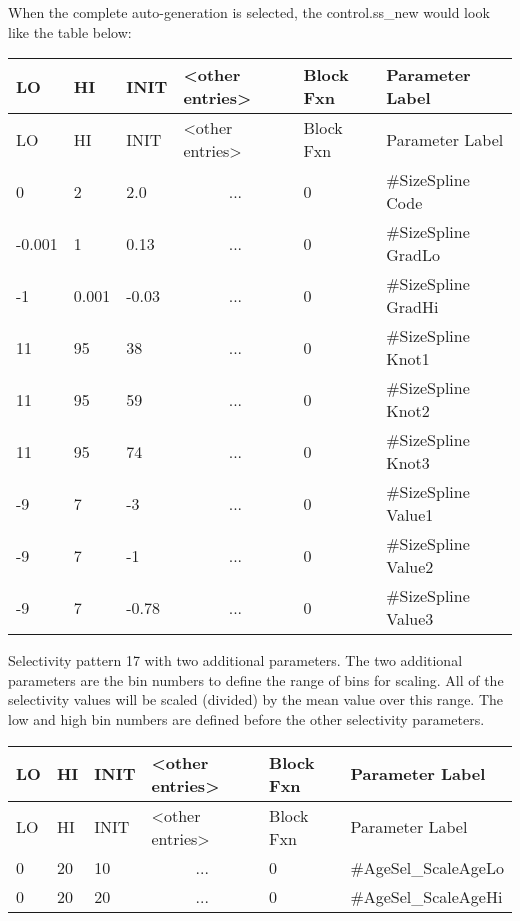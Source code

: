 When the complete auto-generation is selected, the control.ss\_new would look like the table below:	

\begin{longtable}{p{1cm} p{1cm} p{1cm} p{2.9cm} p{1.9cm} p{4.2cm}}
	\hline
	LO \Tstrut & HI & INIT & <other entries> & Block Fxn & Parameter Label \Bstrut\\
	\hline
	\endfirsthead

	\hline
	LO \Tstrut & HI & INIT & <other entries> & Block Fxn & Parameter Label \Bstrut\\
	\hline
	\endhead

	0 \Tstrut &		2 &   2.0 & \multicolumn{1}{c}{...} & 0 & \#SizeSpline Code \\
	-0.001    &		1 &  0.13 & \multicolumn{1}{c}{...} & 0 & \#SizeSpline GradLo \\
	-1        & 0.001 & -0.03 & \multicolumn{1}{c}{...} & 0 & \#SizeSpline GradHi \\
	11        &	   95 & 	38 & \multicolumn{1}{c}{...} & 0 & \#SizeSpline Knot1 \\
	11        &	   95 & 	59 & \multicolumn{1}{c}{...} & 0 & \#SizeSpline Knot2 \\
	11        &	   95 & 	74 & \multicolumn{1}{c}{...} & 0 & \#SizeSpline Knot3 \\
	-9        & 	7 & 	-3 & \multicolumn{1}{c}{...} & 0 & \#SizeSpline Value1 \\
	-9        &		7 & 	-1 & \multicolumn{1}{c}{...} & 0 & \#SizeSpline Value2 \\
	-9        &		7 & -0.78 & \multicolumn{1}{c}{...} & 0 & \#SizeSpline Value3 \Bstrut\\
	\hline
\end{longtable}


Selectivity pattern 17 with two additional parameters. The two additional parameters are the bin numbers to define the range of bins for scaling. All of the selectivity values will be scaled (divided) by the mean value over this range. The low and high bin numbers are defined before the other selectivity parameters.

	\begin{longtable}{p{1cm} p{1cm} p{1cm} p{2.9cm} p{1.9cm} p{4.2cm}}
		\hline
		LO \Tstrut & HI & INIT & <other entries> & Block Fxn & Parameter Label \Bstrut\\
		\hline
		\endfirsthead
	
		\hline
		LO \Tstrut & HI & INIT & <other entries> & Block Fxn & Parameter Label \Bstrut\\
		\hline
		\endhead

		0 & 20 & 10 & \multicolumn{1}{c}{...} & 0 & \#AgeSel\_ScaleAgeLo \Tstrut\\
		0 & 20 & 20 & \multicolumn{1}{c}{...} & 0 & \#AgeSel\_ScaleAgeHi \Bstrut\\
		\hline
	\end{longtable}


